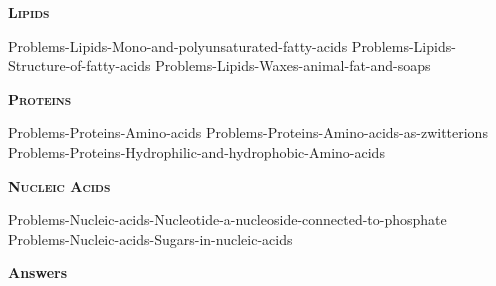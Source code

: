 \documentclass[main.tex]{subfiles}
\newcommand\chapterlabel{Ch-biochemistry}
\begin{document}
\begin{multicols*}{2}
{\raggedright\textsc{\textbf{Lipids}}\par}


 {Problems-Lipids-Mono-and-polyunsaturated-fatty-acids}
 {Problems-Lipids-Structure-of-fatty-acids}
 {Problems-Lipids-Waxes-animal-fat-and-soaps}


 





{\raggedright\textsc{\textbf{Proteins}}\par}




  {Problems-Proteins-Amino-acids}
 {Problems-Proteins-Amino-acids-as-zwitterions}
 {Problems-Proteins-Hydrophilic-and-hydrophobic-Amino-acids}





 

 

{\raggedright\textsc{\textbf{Nucleic Acids}}\par}


 {Problems-Nucleic-acids-Nucleotide-a-nucleoside-connected-to-phosphate}
 {Problems-Nucleic-acids-Sugars-in-nucleic-acids}
 
 

\end{multicols*}
\newpage
\begin{answersenvironment}
\begin{minipage}[c]{1\textwidth}
\begin{localsize}{10}
{\Large \bf Answers}
 \printsolutions 
\end{localsize}
\end{minipage}\end{answersenvironment}
\end{document}
